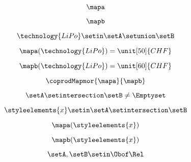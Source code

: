 {\begin{forslides}
        \begin{equation}
            \label{eq:combination-109}
            \mapa
        \end{equation}

        \begin{equation}
            \label{eq:combination-110}
            \mapb
        \end{equation}

        \begin{equation}
            \label{eq:combination-111}
            \technology{LiPo}\setin \setA\setunion \setB
        \end{equation}

        \begin{equation}
            \label{eq:combination-112}
            \mapa(\technology{LiPo})=\unit[50]{CHF}
        \end{equation}

        \begin{equation}
            \label{eq:combination-113}
            \mapb(\technology{LiPo})=\unit[60]{CHF}
        \end{equation}

        \begin{equation}
            \label{eq:combination-114}
            \coprodMapmor{\mapa}{\mapb}
        \end{equation}

        \begin{equation}
            \label{eq:combination-115}
            \setA\setintersection \setB\neq \Emptyset
        \end{equation}

        \begin{equation}
            \label{eq:combination-116}
            \styleelements{x}\setin \setA\setintersection \setB
        \end{equation}

        \begin{equation}
            \label{eq:combination-117}
            \mapa(\styleelements{x})
        \end{equation}

        \begin{equation}
            \label{eq:combination-118}
            \mapb(\styleelements{x})
        \end{equation}

        \begin{equation}
            \label{eq:combination-119}
            \setA,\setB\setin \Obof\Rel
        \end{equation}


\end{forslides}}
